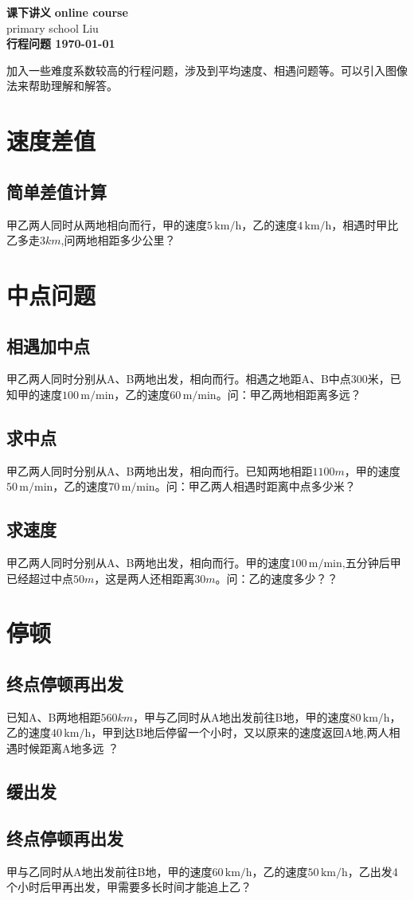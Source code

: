 \documentclass[DIN, pagenumber=false, fontsize=11pt, parskip=half]{scrartcl}
\newcommand{\mytitle}[1]{{\noindent\Large\textbf{#1}}}
\begin{document}
\noindent\textbf{课下讲义} \hfill \textbf{online course}\\
primary school \hfill Liu\\

\mytitle{行程问题 \hfill \today}
\newline
\begin{parchmentquote}
    加入一些难度系数较高的行程问题，涉及到平均速度、相遇问题等。可以引入图像法来帮助理解和解答。
\end{parchmentquote}


\section{速度差值}
\subsection{简单差值计算}
甲乙两人同时从两地相向而行，甲的速度$5\,\text{km/h}$，乙的速度$4\,\text{km/h}$，相遇时甲比乙多走$3km$,问两地相距多少公里？
\section{中点问题}

\subsection{相遇加中点}
甲乙两人同时分别从A、B两地出发，相向而行。相遇之地距A、B中点300米，已知甲的速度$100\,\text{m/min}$，乙的速度$60\,\text{m/min}$。问：甲乙两地相距离多远？

\subsection{求中点}
甲乙两人同时分别从A、B两地出发，相向而行。已知两地相距$1100m$，甲的速度$50\,\text{m/min}$，乙的速度$70\,\text{m/min}$。问：甲乙两人相遇时距离中点多少米？
\subsection{求速度}
甲乙两人同时分别从A、B两地出发，相向而行。甲的速度$100\,\text{m/min}$,五分钟后甲已经超过中点$50m$，这是两人还相距离$30m$。问：乙的速度多少？？
\section{停顿}

\subsection{终点停顿再出发}
已知A、B两地相距$560km$，甲与乙同时从A地出发前往B地，甲的速度$80\,\text{km/h}$，乙的速度$40\,\text{km/h}$，甲到达B地后停留一个小时，又以原来的速度返回A地,两人相遇时候距离A地多远 ？
\subsection{缓出发}
\subsection{终点停顿再出发}
甲与乙同时从A地出发前往B地，甲的速度$60\,\text{km/h}$，乙的速度$50\,\text{km/h}$，乙出发4个小时后甲再出发，甲需要多长时间才能追上乙？
\end{document}
